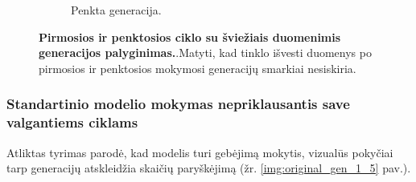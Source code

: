 \documentclass{VUMIFInfKursinis}
\begin{document}
\begin{figure}[H]
\begin{subfigure}[t]{0.45\textwidth}
        \caption{Penkta generacija.}
        \label{img:image2}
    \end{subfigure}
    \caption{\textbf{Pirmosios ir penktosios ciklo su šviežiais duomenimis generacijos palyginimas.}.Matyti, kad tinklo išvesti duomenys po pirmosios ir penktosios mokymosi generacijų smarkiai nesiskiria.}
    \label{img:fresh_gen_1_5}
\end{figure}


\subsubsection{Standartinio modelio mokymas nepriklausantis save valgantiems ciklams}

Atliktas tyrimas parodė, kad modelis turi gebėjimą mokytis, vizualūs pokyčiai tarp generacijų atskleidžia skaičių paryškėjimą (žr. \ref{img:original_gen_1_5} pav.).
\end{document}
